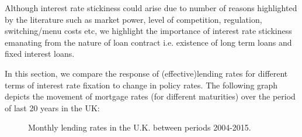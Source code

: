 \documentclass[12pt]{article}
\numberwithin{equation}{section}
\begin{document}
Although interest rate stickiness could arise due to number of reasons highlighted by the literature such as market power, level of competition, regulation, switching/menu costs etc, we highlight the importance of interest rate stickiness emanating from the nature of loan contract i.e. existence of long term loans and fixed interest loans.


In this section, we compare the response of (effective)lending rates for different terms of interest rate fixation to change in policy rates. The following graph depicts the movement of mortgage rates (for different maturities) over the period of last 20 years in the UK:
\begin{figure}[h!] 
	\caption{Monthly lending rates in the U.K. between periods 2004-2015.} 
	\centering
	
\end{figure}
\end{document}
